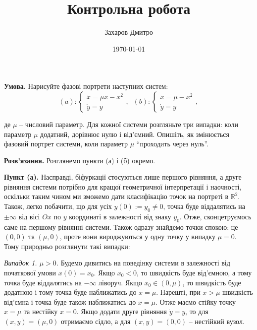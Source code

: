 \documentclass[oneside,solution]{tmpl}
\title{Контрольна робота}
\author{Захаров Дмитро}
\date{\today}
\begin{document}
\maketitle



\hspace{20px}\textbf{Умова.} Нарисуйте фазові портрети наступних систем:
\begin{equation}
    (a): \begin{cases}
        \dot{x} = \mu x - x^2 \\
        \dot{y} = y
    \end{cases}, \; \; (b): \begin{cases}
        \dot{x} = \mu - x^2 \\
        \dot{y} = y
    \end{cases},
\end{equation}

де $\mu$ -- числовий параметр. Для кожної системи розгляньте три випадки: коли параметр $\mu$ додатний, дорівнює нулю і від'ємний. Опишіть, як змінюється фазовий портрет системи, коли параметр $\mu$ ``проходить через нуль''.

\textbf{Розв'язання.} Розглянемо пункти (а) і (б) окремо.

\textbf{Пункт (а).} Насправді, біфуркації стосуються лише першого рівняння, а друге рівняння системи потрібно для кращої геометричної інтерпретації і наочності, оскільки таким чином ми зможемо дати класифікацію точок на портреті в $\mathbb{R}^2$. Також, легко побачити, що для усіх $y(0):=y_0 \neq 0$, точка буде віддалятись на $\pm\infty$ від вісі $Ox$ по $y$ координаті в залежності від знаку $y_0$. Отже, сконцетруємось саме на першому рівнянні системи. Також одразу знайдемо точки спокою: це $(0,0)$ та $(\mu,0)$, проте вони вироджуються у одну точку у випадку $\mu=0$. Тому природньо розглянути такі випадки:

\textit{Випадок 1. $\mu > 0$.} Будемо дивитись на поведінку системи в залежності від початкової умови $x(0)=x_0$. Якщо $x_0<0$, то швидкість буде від'ємною, а тому точка буде віддалятись на $-\infty$ ліворуч. Якщо $x_0 \in (0,\mu)$, то швидкість буде додатною і тому точка буде наближатись до $x=\mu$. Нарешті, при $x>\mu$ швидкість від'ємна і точка буде також наближатись до $x=\mu$. Отже маємо стійку точку $x=\mu$ та нестійку $x=0$. Якщо додати друге рівняння $\dot{y} = y$, то для $(x,y)=(\mu,0)$ отримаємо сідло, а для $(x,y)=(0,0)$ -- нестійкий вузол.
\end{document}
